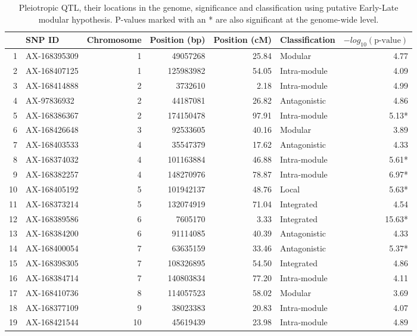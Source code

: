 \begin{refsection}
\begin{table}[ht]
\centering
\caption[List of mapped loci]{Pleiotropic QTL, their locations in the genome, significance and classification using putative Early-Late modular hypothesis. P-values marked with an * are also significant at the genome-wide level.}
\label{qtltable}
\begin{tabular}{rlrrrlr}
  \hline
 & SNP ID & Chromosome & Position (bp) & Position (cM) & Classification & $-log_{10}(\text{p-value})$ \\ 
  \hline
1 & AX-168395309 &   1 & 49057268 & 25.84 & Modular & 4.77 \\ 
  2 & AX-168407125 &   1 & 125983982 & 54.05 & Intra-module & 4.09 \\ 
\midrule
  3 & AX-168414888 &   2 & 3732610 & 2.18 & Intra-module & 4.99 \\ 
  4 & AX-97836932 &   2 & 44187081 & 26.82 & Antagonistic & 4.86 \\ 
  5 & AX-168386367 &   2 & 174150478 & 97.91 & Intra-module & 5.13* \\ 
\midrule
  6 & AX-168426648 &   3 & 92533605 & 40.16 & Modular & 3.89 \\ 
\midrule
  7 & AX-168403533 &   4 & 35547379 & 17.62 & Antagonistic & 4.33 \\ 
  8 & AX-168374032 &   4 & 101163884 & 46.88 & Intra-module & 5.61* \\ 
  9 & AX-168382257 &   4 & 148270976 & 78.87 & Intra-module & 6.97* \\ 
\midrule
  10 & AX-168405192 &   5 & 101942137 & 48.76 & Local & 5.63* \\ 
  11 & AX-168373214 &   5 & 132074919 & 71.04 & Integrated & 4.54 \\ 
\midrule
  12 & AX-168389586 &   6 & 7605170 & 3.33 & Integrated & 15.63* \\ 
  13 & AX-168384200 &   6 & 91114085 & 40.39 & Antagonistic & 4.33 \\ 
\midrule
  14 & AX-168400054 &   7 & 63635159 & 33.46 & Antagonistic & 5.37* \\ 
  15 & AX-168398305 &   7 & 108326895 & 54.50 & Integrated & 4.86 \\ 
  16 & AX-168384714 &   7 & 140803834 & 77.20 & Intra-module & 4.11 \\ 
\midrule
  17 & AX-168410736 &   8 & 114057523 & 58.02 & Modular & 3.69 \\ 
\midrule
  18 & AX-168377109 &   9 & 38023383 & 20.83 & Intra-module & 4.07 \\ 
\midrule
  19 & AX-168421544 &  10 & 45619439 & 23.98 & Intra-module & 4.89 \\ 

\end{tabular}
\end{table}
\end{refsection}
